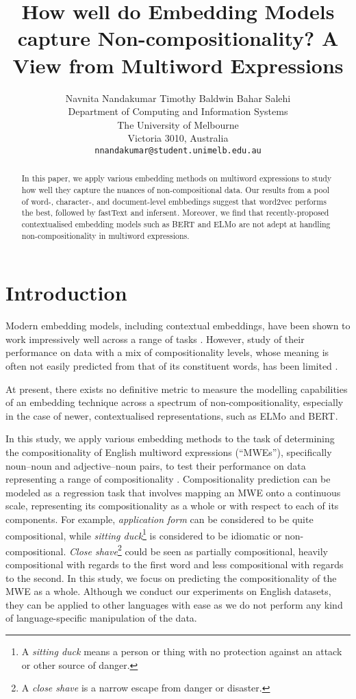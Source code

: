 \documentclass[11pt,a4paper]{article}
\title{How well do Embedding Models capture Non-compositionality? A View
from Multiword Expressions}
\author{Navnita Nandakumar \qquad
  Timothy Baldwin \qquad
  Bahar Salehi\\
	Department of Computing and Information Systems \\
The University of Melbourne \\
Victoria 3010, Australia \\
  {\tt nnandakumar@student.unimelb.edu.au} \qquad {\tt \{tbaldwin|salehi.b\}@unimelb.edu.au}   \\
}
\date{}
\newcommand{\lex}[1]{\textit{#1}\xspace}
\newcommand{\embmethod}[2][]{\textsf{#2}$_{\text{#1}}$\xspace}
\newcommand{\wordtovec}{\embmethod{word2vec}}
\newcommand{\infersent}[1][]{\embmethod[#1]{infersent}}
\newcommand{\elmo}{\embmethod{ELMo}}
\newcommand{\fasttext}{\embmethod{fastText}}
\newcommand{\bert}{\embmethod{BERT}}
\begin{document}
\maketitle

\begin{abstract}
  In this paper, we apply various embedding methods on multiword
  expressions to study how well they capture the nuances of
  non-compositional data. Our results from a pool of word-, character-,
  and document-level embbedings suggest that \wordtovec performs the
  best, followed by \fasttext and \infersent. Moreover, we find that recently-proposed contextualised embedding models such as \bert and \elmo are not adept at handling non-compositionality in multiword expressions. 
\end{abstract}

\section{Introduction}
Modern embedding models, including contextual embeddings, have been shown to work impressively well across a range of tasks \cite{Peters2018,Devlin2018}. However, study of their performance on data with a mix of compositionality levels, whose meaning is often not easily predicted from that of its constituent words, has been limited \cite{Salehi2015,Hakimi2018,Nanda2018}. 

At present, there exists no definitive metric to measure the modelling capabilities of an embedding technique across a spectrum of non-compositionality, especially in the case of newer, contextualised representations, such as \elmo and \bert.

In this study, we apply various embedding methods to the task of determining the compositionality of English multiword expressions (``MWEs''), specifically noun--noun and adjective--noun pairs, to test their performance on data representing a range of compositionality \cite{Sag2002}. Compositionality prediction can be modeled as a regression task \cite{Baldwin2010} that involves mapping an MWE onto a continuous scale, representing its compositionality as a whole or with respect to each of its components. For example, \lex{application form} can be considered to be quite compositional, while \lex{sitting duck}\footnote{A \lex{sitting duck} means a person or thing with no protection against an attack or other source of danger.} is considered to be idiomatic or non-compositional. \lex{Close shave}\footnote{A \lex{close shave} is a narrow escape from danger or disaster.} could be seen as partially compositional, heavily compositional with regards to the first word and less compositional with regards to the second. In this study, we focus on predicting the compositionality of the MWE as a whole. Although we conduct our experiments on English datasets, they can be applied to other languages with ease as we do not perform any kind of language-specific manipulation of the data.
\end{document}
